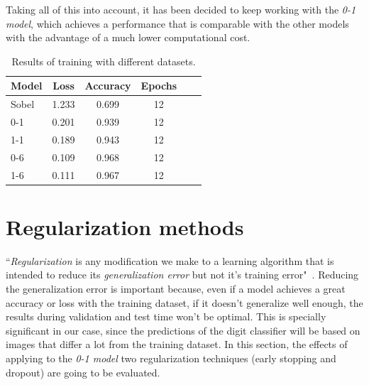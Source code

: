 Taking all of this into account, it has been decided to keep working with the \emph{\textit{0-1} model}, which achieves a performance that is comparable with the other models with the advantage of a much lower computational cost.

\begin{table}
	\centering
	\begin{tabular}{l*{4}{c}r}
		\textbf{Model} & \textbf{Loss} & \textbf{Accuracy} & \textbf{Epochs} \\
		\hline
		Sobel & 1.233 & 0.699 & 12 \\
		0-1 & 0.201 & 0.939 & 12 \\
		1-1 & 0.189 & 0.943 & 12 \\
		0-6 & 0.109 & 0.968 & 12 \\
		1-6 & 0.111 & 0.967 & 12 \\
	\end{tabular}
	\caption{Results of training with different datasets.}
	\label{tbl:datasets}
\end{table}

\section{Regularization methods}
``\emph{Regularization} is any modification we make to a learning algorithm that is intended to reduce its \emph{generalization error} but not it's training error"~\cite{Goodfellow-et-al-2016}. Reducing the generalization error is important because, even if a model achieves a great accuracy or loss with the training dataset, if it doesn't generalize well enough, the results during validation and test time won't be optimal. This is specially significant in our case, since the predictions of the digit classifier will be based on images that differ a lot from the training dataset. In this section, the effects of applying to the \emph{\textit{0-1} model} two regularization techniques (early stopping and dropout) are going to be evaluated. 

